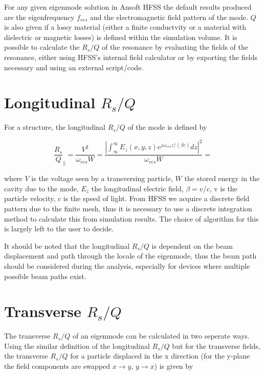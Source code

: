 \documentclass[a4]{report}
\begin{document}
%

For any given eigenmode solution in Ansoft HFSS the default results produced are the eigenfrequency $f_{res}$ and the electromagnetic field pattern of the mode. $Q$ is also given if a lossy material (either a finite conductvity or a material with dielectric or magnetic losses)  is defined within the simulation volume. It is possible to calculate the $R_{s}/Q$ of the resonance by evaluating the fields of the resonance, either using HFSS's internal field calculator or by exporting the fields necessary and using an external script/code.

\section{Longitudinal $R_{s}/Q$}

For a structure, the longitudinal $R_{s}/Q$ of the mode is defined by

\begin{equation}
\frac{R_{s}}{Q}_{\parallel} = \frac{V^{2}}{\omega_{res} W} = \frac{\left| \int^{\infty}_{\infty} E_{z} \left( x,y,z \right) e^{j \omega_{res}z/\left( \beta c \right)} dz \right|^{2}}{\omega_{res} W} = 
\end{equation}

where $V$ is the voltage seen by a transversing particle, $W$ the stored energy in the cavity due to the mode, $E_{z}$ the longitudinal electric field, $\beta = v/c$, v is the particle velocity, $c$ is the speed of light. From HFSS we acquire a discrete field pattern due to the finite mesh, thus it is necessary to use a discrete integration method to calculate this from simulation results. The choice of algorithm for this is largely left to the user to decide.

It should be noted that the longitudinal $R_{s}/Q$ is dependent on the beam displacement and path through the locale of the eigenmode, thus the beam path should be considered during the analysis, especially for devices where multiple possible beam paths exist.

\section{Transverse $R_{s}/Q$}

The transverse $R_{s}/Q$ of an eigenmode can be calculated in two seperate ways. Using the similar definition of the longitudinal $R_{s}/Q$ but for the transverse fields, the transverse $R_{s}/Q$ for a particle displaced in the x direction (for the y-plane the field components are swapped $x \rightarrow y$, $y \rightarrow x$) is given by \cite{AlexejGrudiev}
\end{document}
